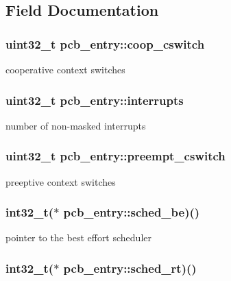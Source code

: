 \subsection{Field Documentation}
\hypertarget{structpcb__entry_ac5899befd89fa0e8b2aeceed85e01415}{
\subsubsection[{coop\-\_\-cswitch}]{\setlength{\rightskip}{0pt plus 5cm}uint32\-\_\-t pcb\-\_\-entry\-::coop\-\_\-cswitch}}\label{structpcb__entry_ac5899befd89fa0e8b2aeceed85e01415}
cooperative context switches \hypertarget{structpcb__entry_ae5474e1d477335caf5515d8a940d1f77}{
\subsubsection[{interrupts}]{\setlength{\rightskip}{0pt plus 5cm}uint32\-\_\-t pcb\-\_\-entry\-::interrupts}}\label{structpcb__entry_ae5474e1d477335caf5515d8a940d1f77}
number of non-\/masked interrupts \hypertarget{structpcb__entry_af49c7195c79f5de2d70825e2252c8d77}{
\subsubsection[{preempt\-\_\-cswitch}]{\setlength{\rightskip}{0pt plus 5cm}uint32\-\_\-t pcb\-\_\-entry\-::preempt\-\_\-cswitch}}\label{structpcb__entry_af49c7195c79f5de2d70825e2252c8d77}
preeptive context switches \hypertarget{structpcb__entry_aaf3abd937873f1cfa6cea1f4921d5f7a}{
\subsubsection[{sched\-\_\-be}]{\setlength{\rightskip}{0pt plus 5cm}int32\-\_\-t($\ast$ pcb\-\_\-entry\-::sched\-\_\-be)()}}\label{structpcb__entry_aaf3abd937873f1cfa6cea1f4921d5f7a}
pointer to the best effort scheduler \hypertarget{structpcb__entry_ad3c7b06bf949312a542d036f92d2619a}{
\subsubsection[{sched\-\_\-rt}]{\setlength{\rightskip}{0pt plus 5cm}int32\-\_\-t($\ast$ pcb\-\_\-entry\-::sched\-\_\-rt)()}}\label{structpcb__entry_ad3c7b06bf949312a542d036f92d2619a}
